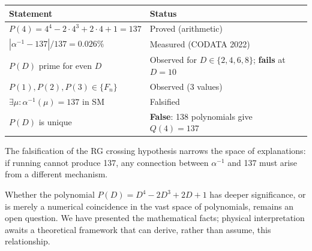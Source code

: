 \documentclass[11pt,a4paper]{article}
\begin{document}
\begin{center}
\begin{tabular}{|l|l|}
\hline
\textbf{Statement} & \textbf{Status} \\
\hline
$P(4) = 4^4 - 2 \cdot 4^3 + 2 \cdot 4 + 1 = 137$ & Proved (arithmetic) \\
$|\alpha^{-1} - 137|/137 = 0.026\%$ & Measured (CODATA 2022) \\
$P(D)$ prime for even $D$ & Observed for $D \in \{2,4,6,8\}$; \textbf{fails} at $D=10$ \\
$P(1), P(2), P(3) \in \{F_n\}$ & Observed (3 values) \\
$\exists \mu: \alpha^{-1}(\mu) = 137$ in SM & Falsified \\
$P(D)$ is unique & \textbf{False}: 138 polynomials give $Q(4)=137$ \\
\hline
\end{tabular}
\end{center}

The falsification of the RG crossing hypothesis narrows the space of explanations: if running cannot produce 137, any connection between $\alpha^{-1}$ and 137 must arise from a different mechanism.

Whether the polynomial $P(D) = D^4 - 2D^3 + 2D + 1$ has deeper significance, or is merely a numerical coincidence in the vast space of polynomials, remains an open question. We have presented the mathematical facts; physical interpretation awaits a theoretical framework that can derive, rather than assume, this relationship.
\end{document}
